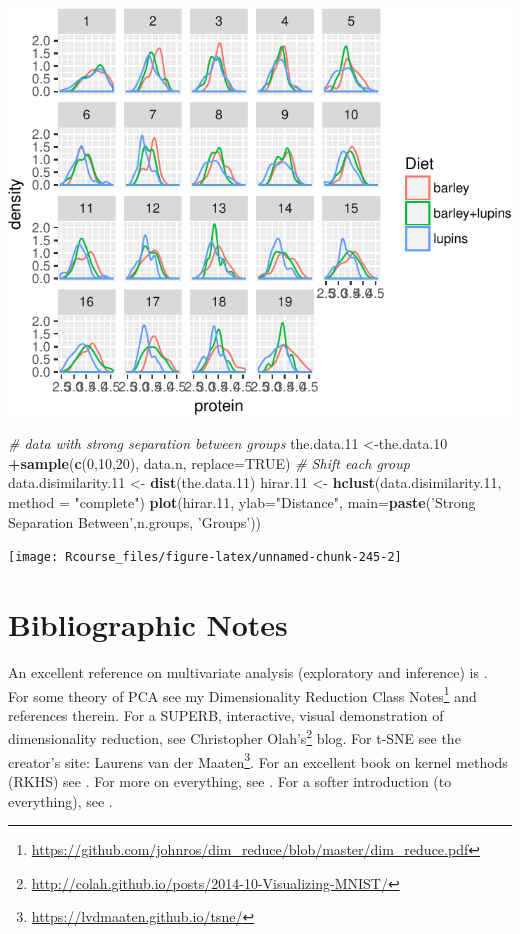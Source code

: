 \documentclass[]{book}
\newenvironment{Shaded}{\begin{snugshade}}{\end{snugshade}}
\newcommand{\CommentTok}[1]{\textcolor[rgb]{0.56,0.35,0.01}{\textit{#1}}}
\newcommand{\DataTypeTok}[1]{\textcolor[rgb]{0.13,0.29,0.53}{#1}}
\newcommand{\DecValTok}[1]{\textcolor[rgb]{0.00,0.00,0.81}{#1}}
\newcommand{\FloatTok}[1]{\textcolor[rgb]{0.00,0.00,0.81}{#1}}
\newcommand{\KeywordTok}[1]{\textcolor[rgb]{0.13,0.29,0.53}{\textbf{#1}}}
\newcommand{\NormalTok}[1]{#1}
\newcommand{\OperatorTok}[1]{\textcolor[rgb]{0.81,0.36,0.00}{\textbf{#1}}}
\newcommand{\OtherTok}[1]{\textcolor[rgb]{0.56,0.35,0.01}{#1}}
\newcommand{\StringTok}[1]{\textcolor[rgb]{0.31,0.60,0.02}{#1}}
\renewcommand{\href}[2]{#2\footnote{\url{#1}}}
\theoremstyle{definition}
\theoremstyle{definition}
\theoremstyle{definition}
\theoremstyle{remark}
\begin{document}
\includegraphics[width=0.5\linewidth]{Rcourse_files/figure-latex/unnamed-chunk-245-1}

\begin{Shaded}
\begin{Highlighting}[]
\CommentTok{# data with strong separation between groups}
\NormalTok{the.data}\FloatTok{.11}\NormalTok{ <-the.data}\FloatTok{.10} \OperatorTok{+}\KeywordTok{sample}\NormalTok{(}\KeywordTok{c}\NormalTok{(}\DecValTok{0}\NormalTok{,}\DecValTok{10}\NormalTok{,}\DecValTok{20}\NormalTok{), data.n, }\DataTypeTok{replace=}\OtherTok{TRUE}\NormalTok{) }\CommentTok{# Shift each group }
\NormalTok{data.disimilarity}\FloatTok{.11}\NormalTok{ <-}\StringTok{ }\KeywordTok{dist}\NormalTok{(the.data}\FloatTok{.11}\NormalTok{)}
\NormalTok{hirar}\FloatTok{.11}\NormalTok{ <-}\StringTok{ }\KeywordTok{hclust}\NormalTok{(data.disimilarity}\FloatTok{.11}\NormalTok{, }\DataTypeTok{method =} \StringTok{"complete"}\NormalTok{)}
\KeywordTok{plot}\NormalTok{(hirar}\FloatTok{.11}\NormalTok{, }\DataTypeTok{ylab=}\StringTok{"Distance"}\NormalTok{, }\DataTypeTok{main=}\KeywordTok{paste}\NormalTok{(}\StringTok{'Strong Separation Between'}\NormalTok{,n.groups, }\StringTok{'Groups'}\NormalTok{))}
\end{Highlighting}
\end{Shaded}

\texttt{[image: Rcourse\_files/figure-latex/unnamed-chunk-245-2]}

\hypertarget{bibliographic-notes-9}{%
\section{Bibliographic Notes}\label{bibliographic-notes-9}}

An excellent reference on multivariate analysis (exploratory and inference) is \citet{izenman2008modern}.
For some theory of PCA see my \href{https://github.com/johnros/dim_reduce/blob/master/dim_reduce.pdf}{Dimensionality Reduction Class Notes} and references therein.
For a SUPERB, interactive, visual demonstration of dimensionality reduction, see \href{http://colah.github.io/posts/2014-10-Visualizing-MNIST/}{Christopher Olah's} blog.
For t-SNE see the creator's site: \href{https://lvdmaaten.github.io/tsne/}{Laurens van der Maaten}.
For an excellent book on kernel methods (RKHS) see \citet{shawe2004kernel}.
For more on everything, see \citet{friedman2001elements}.
For a softer introduction (to everything), see \citet{james2013introduction}.
\end{document}
